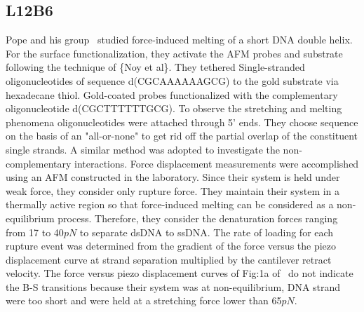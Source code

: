 \documentclass[12pt,masters,final]{UTRGVthesis}
\begin{document}
\subsection{L12B6}
 Pope and his group~\cite{Pope:2001} studied force-induced melting of a short DNA double helix. For the surface functionalization, they activate the AFM probes and substrate following the technique of \{Noy et al\}. They tethered Single-stranded oligonucleotides of sequence d(CGCAAAAAAGCG) to the gold substrate via hexadecane thiol. Gold-coated probes functionalized with the complementary oligonucleotide d(CGCTTTTTTGCG). To observe the stretching and melting phenomena oligonucleotides were attached through 5' ends. They choose sequence on the basis of an "all-or-none" to get rid off the partial overlap of the constituent single strands. A similar method was adopted to investigate the non-complementary interactions. Force displacement measurements were accomplished using an AFM constructed in the laboratory. Since their system is held under weak force, they consider only rupture force. They maintain their system in a thermally active region so that force-induced melting can be considered as a non-equilibrium process. Therefore, they consider the denaturation forces ranging from 17 to 40$pN$ to separate dsDNA to ssDNA. The rate of loading for each rupture event was determined from the gradient of the force versus the piezo displacement curve at strand separation multiplied by the cantilever retract velocity. The force versus piezo displacement curves of Fig:1a of~\cite{Pope:2001} do not indicate the B-S transitions because their system was at non-equilibrium, DNA strand were too short and were held at a stretching force lower than 65$pN$.
\end{document}
